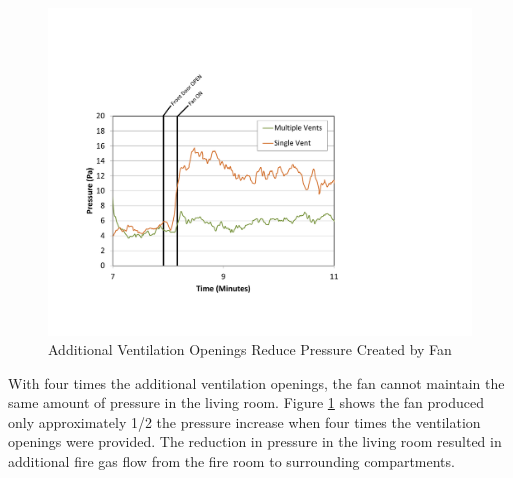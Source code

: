 \documentclass{article}
\begin{document}
\begin{figure} [H]
	\centering
	\includegraphics[width = 3 in]{0_Images/Tactical_Considerations/Additional_Vent/PressureSingle_Multiple.pdf}
	\caption{Additional Ventilation Openings Reduce Pressure Created by Fan}
	\label{fig:AdditionalVents_Pressure}
\end{figure}

With four times the additional ventilation openings, the fan cannot maintain the same amount of pressure in the living room. Figure \ref{fig:AdditionalVents_Pressure} shows the fan produced only approximately 1/2 the pressure increase when four times the ventilation openings were provided. The reduction in pressure in the living room resulted in additional fire gas flow from the fire room to surrounding compartments. 
\end{document}

